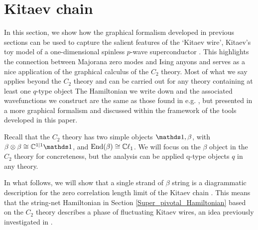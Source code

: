 
\section{Kitaev chain} \label{kitaev_wire}

In this section, we show how the graphical formalism developed in previous sections
can be used to capture the salient features of the `Kitaev wire', 
Kitaev's toy model of a one-dimensional spinless $p$-wave superconductor \cite{kitaev2001}. 
This highlights the connection between Majorana zero modes and Ising anyons and serves 
as a nice application of the graphical calculus of the $C_2$ theory.
Most of what we say applies beyond the $C_2$ theory and can be carried out for any theory containing at least one $q$-type object
The Hamiltonian we write down and the associated wavefunctions we construct are 
the same as those found in e.g. \cite{fidkowski2011}, but presented in a more graphical formalism and 
discussed within the framework of the tools developed in this paper. 

Recall that the $C_2$ theory has two simple objects $\unit,\beta$,
with $\beta\tp \beta\cong \cc^{1|1}\unit$,
and $\text{End}(\beta) \cong \mathbb{C}\ell_1$.
We will focus on the $\beta$ object in the $C_2$ 
theory for concreteness, but the analysis can be applied q-type objects $q$ in any theory.

In what follows, 
we will show that a single strand of $\beta$ string is a diagrammatic description for the zero correlation length limit of the Kitaev chain
 .
This means that the string-net Hamiltonian in Section \ref{Super_pivotal_Hamiltonian} 
based on the $C_2$ theory describes a phase of fluctuating Kitaev wires, 
an idea previously investigated in \cite{tarantino2016,ware2016,kapustin2017}.

